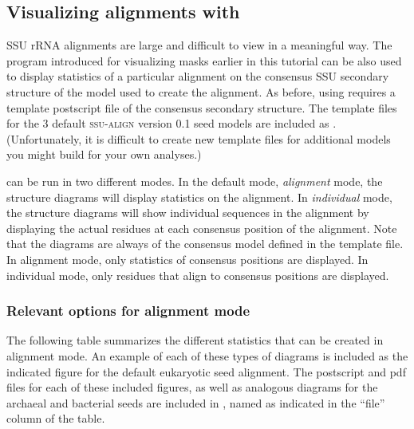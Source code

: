 \subsection{Visualizing alignments with }

SSU rRNA alignments are large and difficult to view in a meaningful
way. The  program introduced for visualizing masks
earlier in this tutorial can be also used to display statistics of
a particular alignment on the consensus SSU secondary structure of the
model used to create the alignment. As before,
using  requires a template postscript file of the
consensus secondary structure. The template files for the 3 default
\textsc{ssu-align} version 0.1 seed models are included as
. 
(Unfortunately, it is difficult to create new template files for
additional models you might build for your own analyses.) 

 can be run in two different modes. In the default
mode, \emph{alignment} mode, the structure diagrams will display
statistics on the alignment. In \emph{individual} mode, the structure
diagrams will show individual sequences in the alignment by displaying
the actual residues at each consensus position of the alignment. Note
that the diagrams are always of the consensus model defined in the
template file. In alignment mode, only statistics of consensus
positions are displayed. In individual mode, only residues that align to
consensus positions are displayed.

\subsubsection{Relevant options for alignment mode}

The following table summarizes the different statistics that can be
created in alignment mode.
An example of each of these types of
diagrams is included as the indicated figure for the default
eukaryotic seed alignment. The postscript and pdf files for each of
these included figures, as well as analogous diagrams for the
archaeal and bacterial seeds are included in 
, named as indicated 
in the ``file'' column of the table. 

